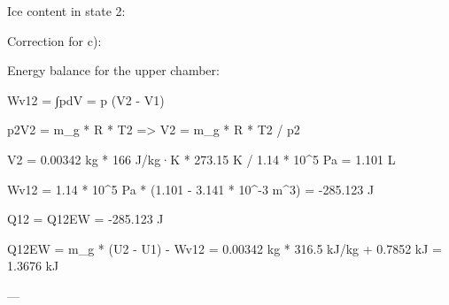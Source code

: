 Ice content in state 2:  

Correction for c):  

Energy balance for the upper chamber:  

Wv12 = ∫pdV = p (V2 - V1)  

p2V2 = m_g * R * T2 => V2 = m_g * R * T2 / p2  

V2 = 0.00342 kg * 166 J/kg·K * 273.15 K / 1.14 * 10^5 Pa = 1.101 L  

Wv12 = 1.14 * 10^5 Pa * (1.101 - 3.141 * 10^-3 m^3) = -285.123 J  

Q12 = Q12EW = -285.123 J  

Q12EW = m_g * (U2 - U1) - Wv12 = 0.00342 kg * 316.5 kJ/kg + 0.7852 kJ = 1.3676 kJ  

---